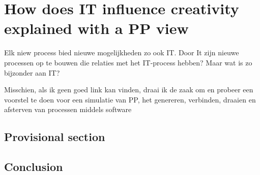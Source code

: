 \chapter{How does IT influence creativity explained with a PP view}


Elk niew process bied nieuwe mogelijkheden zo ook IT. Door It zijn nieuwe processen op te bouwen die relaties met het IT-process hebben? Maar wat is zo bijzonder aan IT?

Misschien, als ik geen goed link kan vinden, draai ik de zaak om en probeer een voorstel te doen voor een simulatie van PP, het genereren, verbinden, draaien en afsterven van processen middels software

\section{Provisional section}

\section{Conclusion}